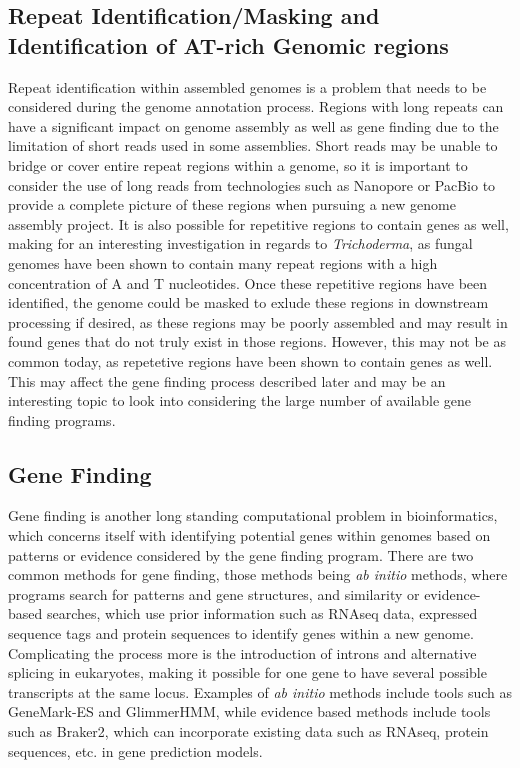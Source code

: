 \documentclass[12pt]{article}
\begin{document}
\subsection{Repeat Identification/Masking and Identification of AT-rich Genomic regions}
Repeat identification within assembled genomes is a problem that needs
to be considered during the genome annotation process. Regions with
long repeats can have a significant impact on genome assembly as well
as gene finding due to the limitation of short reads used in some
assemblies\cite{Repeats}. Short reads may be unable to bridge or cover
entire repeat regions within a genome, so it is important to consider
the use of long reads from technologies such as Nanopore or PacBio to
provide a complete picture of these regions when pursuing a new genome
assembly project. It is also possible for repetitive regions to
contain genes as well, making for an interesting investigation in
regards to \textit{Trichoderma}, as fungal genomes have been shown to
contain many repeat regions with a high concentration of A and T
nucleotides\cite{fungalrepeats}. Once these repetitive regions have
been identified, the genome could be masked to exlude these regions in
downstream processing if desired, as these regions may be poorly
assembled and may result in found genes that do not truly exist in
those regions. However, this may not be as common today, as repetetive
regions have been shown to contain genes as well\cite{dontMask}. This
may affect the gene finding process described later and may be an
interesting topic to look into considering the large number of
available gene finding programs.

\subsection{Gene Finding}
Gene finding is another long standing computational problem in
bioinformatics, which concerns itself with identifying potential genes
within genomes based on patterns or evidence considered by the gene
finding program. There are two common methods for gene finding, those
methods being \textit{ab initio} methods, where programs search for
patterns and gene structures, and similarity or evidence-based
searches, which use prior information such as RNAseq data, expressed
sequence tags and protein sequences to identify genes within a new
genome\cite{GeneFinding}. Complicating the process more is the
introduction of introns and alternative splicing in eukaryotes, making
it possible for one gene to have several possible transcripts at the
same locus. Examples of \textit{ab initio} methods include tools such
as GeneMark-ES\cite{GeneMarkES} and GlimmerHMM\cite{Glimmer}, while
evidence based methods include tools such as Braker2\cite{Braker2},
which can incorporate existing data such as RNAseq, protein sequences,
etc. in gene prediction models.
\end{document}
